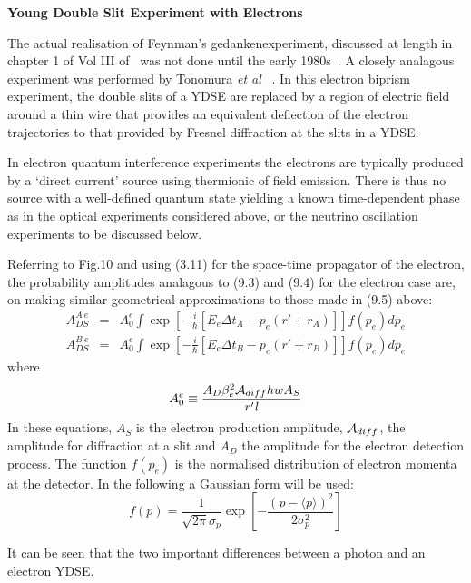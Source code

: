 {     \par {\bf \Large Young Double Slit Experiment with Electrons}
      \par The actual realisation of Feynman's gedankenexperiment, discussed at length in chapter 1 of Vol III
    of~\cite{Feyn2} was not done until the early 1980s~\cite{TIKH}. A closely analagous experiment was
    performed by Tonomura {\it et al} ~\cite{TEMK}.
    In this electron biprism experiment, the double slits of a YDSE are replaced by a region of electric 
     field around a thin wire that provides an equivalent deflection of the electron trajectories to that
     provided by Fresnel diffraction at the slits in a YDSE. 
    \par In electron quantum interference experiments the electrons are typically 
    produced by a `direct current' source using thermionic of field emission.
    There is thus no source with a well-defined quantum state yielding a known time-dependent
   phase as in the optical experiments considered above, or the neutrino oscillation experiments to 
   be discussed below. 
   \par Referring to Fig.10 and using (3.11) for the space-time propagator of the electron,
   the probability amplitudes analagous to (9.3) and (9.4) for the electron case are, on making similar
    geometrical approximations to those made in (9.5) above:
  \begin{eqnarray}
    A_{DS}^{A~e} & = &  A_0^e
   \int \exp\left[-\frac{i}{\hbar}[E_e \Delta t_A-p_e(r'+r_A)]\right] f(p_e)d p_e \\
   A_{DS}^{B ~e} & = &  A_0^e
   \int \exp\left[-\frac{i}{\hbar}[E_e \Delta t_B-p_e(r'+r_B)]\right] f(p_e)d p_e
  \end{eqnarray}
   where 
    \begin{equation}
      A_0^e \equiv  \frac{A_D \beta_e^2  {\cal A}_{diff} h w A_S}{r' {\it l}}
    \end{equation}  
   In these equations, $A_S$ is the electron production amplitude, ${\cal A}_{diff}$, the amplitude for
    diffraction at a slit and $A_D$ the amplitude for the electron detection process. The function
    $f(p_e)$ is the normalised distribution of electron momenta at the detector. In the following
   a Gaussian form will be used:
    \begin{equation}
     f(p) = \frac{1}{\sqrt{2 \pi}\sigma_p}\exp\left[-\frac{(p-\langle p \rangle)^2}{2 \sigma_p^2}\right]
   \end{equation} 
    \par It can be seen that the two important differences between a photon and  an electron YDSE.
}

